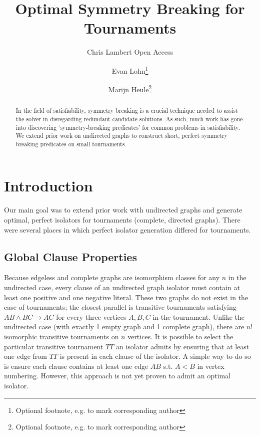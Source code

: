 \documentclass[a4paper,UKenglish,cleveref, autoref, thm-restate]{lipics-v2021}
\title{Optimal Symmetry Breaking for Tournaments}
\author{Chris Lambert {Open Access}}{Dummy University Computing Laboratory, [optional: Address], Country \and My second affiliation, Country \and \url{http://www.myhomepage.edu} }{johnqpublic@dummyuni.org}{https://orcid.org/0000-0002-1825-0097}{(Optional) author-specific funding acknowledgements}%
\author{Evan Lohn\footnote{Optional footnote, e.g. to mark corresponding author}}{Department of Informatics, Dummy College, [optional: Address], Country}{joanrpublic@dummycollege.org}{[orcid]}{[funding]}
\author{Marijn Heule\footnote{Optional footnote, e.g. to mark corresponding author}}{Department of Informatics, Dummy College, [optional: Address], Country}{joanrpublic@dummycollege.org}{[orcid]}{[funding]}
\begin{document}
\maketitle

%
\begin{abstract}
In the field of satisfiability, symmetry breaking is a crucial technique needed to assist the solver in disregarding redundant candidate solutions.  As such, much work has gone into discovering `symmetry-breaking predicates' for common problems in satisfiability.  We extend prior work on undirected graphs to construct short, perfect symmetry breaking predicates on small tournaments.

\end{abstract}
%
%



\section{Introduction}
Our main goal was to extend prior work \cite{ref_heule} with undirected graphs and generate optimal, perfect isolators for tournaments (complete, directed graphs). There were several places in which perfect isolator generation differed for tournaments.

\subsection{Global Clause Properties}
Because edgeless and complete graphs are isomorphism classes for any $n$ in the undirected case, every clause of an undirected graph isolator must contain at least one positive and one negative literal. These two graphs do not exist in the case of tournaments; the closest parallel is transitive tournaments satisfying $AB \land BC \rightarrow AC$ for every three vertices $A,B,C$ in the tournament. Unlike the undirected case (with exactly 1 empty graph and 1 complete graph), there are $n!$ isomorphic transitive tournaments on $n$ vertices. It is possible to select the particular transitive tournament $TT$ an isolator admits by ensuring that at least one edge from $TT$ is present in each clause of the isolator. A simple way to do so is ensure each clause contains at least one edge $AB$ s.t. $A<B$ in vertex numbering. However, this approach is not yet proven to admit an optimal isolator.
\end{document}
